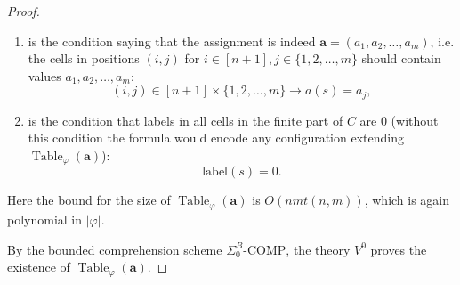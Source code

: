 \documentclass{article}
\theoremstyle{plain}
\theoremstyle{definition}
\DeclareMathOperator{\Table}{Table}
\DeclareMathOperator{\flag}{flag}
\newcommand{\pc}{\mathsf{pc}}
\newcommand{\pd}{\mathsf{pd}}
\newcommand{\tuple}{\mathbf}
\begin{document}
\begin{proof}
\begin{enumerate}[label=(\alph*)]
\begin{enumerate}[label=(\Alph*)]
    \item a conjunction of technical conditions (i)--(iv)

    \begin{enumerate}
        \item $\bigl(j =0 \vee (i,j)=(0, m+1)\bigr) \rightarrow \flag(s) = a(s) = \pd(s) = \pc(s) = \square$
        \item $\bigl(i =0 \wedge j \in\{1, 2, \dots, m\}\bigr) \rightarrow \flag(s) = \pd(s) = \pc(s) = \square$
        \item $\bigl(i \in \{1, 2 \dots, n\} \wedge j=m+1\bigr) \rightarrow \flag(s) = a(s) = \pd(s) = \square$
        \item $\bigl(i \in \{1, 2, \dots, n\} \wedge j \in\{1,2, \dots m\}\bigr) \rightarrow \pc(s) = \square$
    \end{enumerate}
\end{enumerate}


    \item is the condition saying that the assignment is indeed $\tuple a = (a_1, a_2, \dots, a_m)$, i.e. the cells in positions $(i,j)$ for $i \in [n+1], j \in \{1, 2, \dots, m\}$ should contain values $a_1, a_2, \dots, a_m$: 
    \[
     (i,j) \in [n+1]\times \{1, 2, \dots, m\} \rightarrow a(s) = a_j,
    \]
    
    \item is the condition that labels in all cells in the finite part of $C$ are $0$ (without this condition the formula would encode any configuration extending $\Table_\varphi(\tuple a)$):
    \[
    \mathrm{label}(s) = 0. 
    \]
\end{enumerate}

Here the bound for the size of $\Table_\varphi(\tuple a)$ is $O(n m t(n,m))$, which is again polynomial in $|\varphi|$.  

By the bounded comprehension scheme $\Sigma^B_0\text{-COMP}$, the theory $V^0$ proves the existence of $\Table_\varphi(\tuple a)$.
\end{proof}
\end{document}
